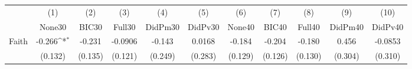{
\def\sym#1{\ifmmode^{#1}\else\(^{#1}\)\fi}
\begin{tabular}{l*{10}{c}}
\toprule
            &\multicolumn{1}{c}{(1)}&\multicolumn{1}{c}{(2)}&\multicolumn{1}{c}{(3)}&\multicolumn{1}{c}{(4)}&\multicolumn{1}{c}{(5)}&\multicolumn{1}{c}{(6)}&\multicolumn{1}{c}{(7)}&\multicolumn{1}{c}{(8)}&\multicolumn{1}{c}{(9)}&\multicolumn{1}{c}{(10)}\\
            &\multicolumn{1}{c}{None30}&\multicolumn{1}{c}{BIC30}&\multicolumn{1}{c}{Full30}&\multicolumn{1}{c}{DidPm30}&\multicolumn{1}{c}{DidPv30}&\multicolumn{1}{c}{None40}&\multicolumn{1}{c}{BIC40}&\multicolumn{1}{c}{Full40}&\multicolumn{1}{c}{DidPm40}&\multicolumn{1}{c}{DidPv40}\\
\midrule
Faith       &      -0.266\sym{*}  &      -0.231         &     -0.0906         &      -0.143         &      0.0168         &      -0.184         &      -0.204         &      -0.180         &       0.456         &     -0.0853         \\
            &     (0.132)         &     (0.135)         &     (0.121)         &     (0.249)         &     (0.283)         &     (0.129)         &     (0.126)         &     (0.130)         &     (0.304)         &     (0.310)         \\
\bottomrule
\end{tabular}
}
